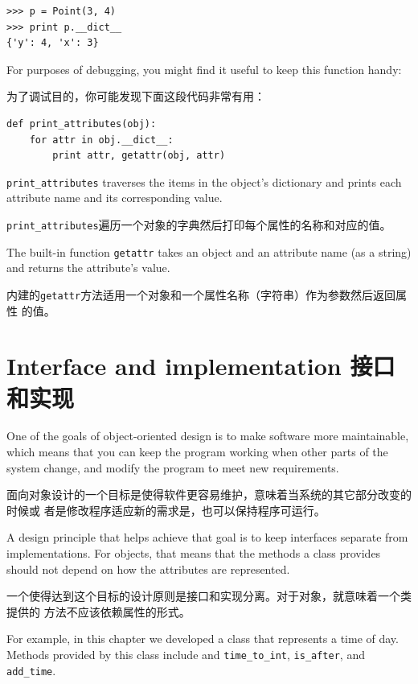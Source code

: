 \documentclass[10pt]{book}
\begin{document}
\begin{CJK}{UTF8}{gbsn}
\begin{verbatim}
>>> p = Point(3, 4)
>>> print p.__dict__
{'y': 4, 'x': 3}
\end{verbatim}
%
For purposes of debugging, you might find it useful to keep this
function handy:

为了调试目的，你可能发现下面这段代码非常有用：

\begin{verbatim}
def print_attributes(obj):
    for attr in obj.__dict__:
        print attr, getattr(obj, attr)
\end{verbatim}
%
\verb"print_attributes" traverses the items in the object's dictionary
and prints each attribute name and its corresponding value.

\verb"print_attributes"遍历一个对象的字典然后打印每个属性的名称和对应的值。

The built-in function {\tt getattr} takes an object and an attribute
name (as a string) and returns the attribute's value.

内建的{\tt getattr}方法适用一个对象和一个属性名称（字符串）作为参数然后返回属性
的值。


\section{Interface and implementation 接口和实现}

One of the goals of object-oriented design is to make software more
maintainable, which means that you can keep the program working when
other parts of the system change, and modify the program to meet new
requirements.

面向对象设计的一个目标是使得软件更容易维护，意味着当系统的其它部分改变的时候或
者是修改程序适应新的需求是，也可以保持程序可运行。

A design principle that helps achieve that goal is to keep
interfaces separate from implementations.  For objects, that means
that the methods a class provides should not depend on how the
attributes are represented.

一个使得达到这个目标的设计原则是接口和实现分离。对于对象，就意味着一个类提供的
方法不应该依赖属性的形式。

For example, in this chapter we developed a class that represents
a time of day.  Methods provided by this class include
and \verb"time_to_int", \verb"is_after", and \verb"add_time".


\end{CJK}
\end{document}
